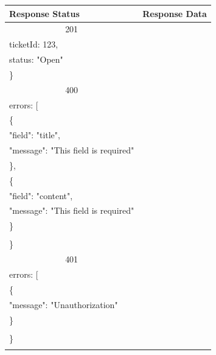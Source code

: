 \documentclass[12pt,oneside,openright,a4paper]{cpe-thai-project}
\begin{document}
\begin{itemize}
\begin{longtable}[!ht]{p{3cm}|p{8cm}}
    \textbf{Response Status}  & \multicolumn{1}{c}{\textbf{Response Data}}                                                                          \\ \hline
    \multicolumn{1}{c|}{201}  & \begin{tabular}[c]{@{}l@{}}\{\\ \quad ticketId: 123,\\ \quad status: "Open"\\ \}\end{tabular}                                 \\ \hline
    \multicolumn{1}{c|}{400}  &
    \begin{tabular}[c]{@{}l@{}}\{\\ \quad errors: {[}\\ \quad\quad\{\\ \quad\quad\quad "field": "title",\\ \quad\quad\quad"message": "This field is required"\\ \quad\quad\},\\ 
      \quad\quad\{\\ \quad\quad\quad"field": "content",\\ \quad\quad\quad "message": "This field is required"\\ \quad\quad \}\\\quad {]}\\ \}\end{tabular}  \\ \hline
    \multicolumn{1}{c|}{401}  &
    \begin{tabular}[c]{@{}l@{}}\{\\ \quad errors: {[}\\ \quad\quad\{\\ \quad\quad\quad"message": "Unauthorization"\\ \quad\quad\}\\\quad {]}\\ \}\end{tabular}                                                                         \\ \hline
    \hhline{==}
\end{longtable}


\end{itemize}
\end{document}
